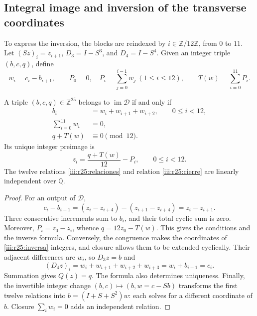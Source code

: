 \subsection{Integral image and inversion of the transverse coordinates}
\label{iii:r25:imagen-seccion}

To express the inversion, the blocks are reindexed by
$i\in\mathbb Z/12\mathbb Z$, from $0$ to $11$. Let
$(Sz)_i=z_{i+1}$, $D_3=I-S^3$, and $D_4=I-S^4$.
Given an integer triple $(b,c,q)$, define
\begin{equation}
 w_i=c_i-b_{i+1},\qquad
 P_0=0,\quad P_i=\sum_{j=0}^{i-1}w_j\ (1\leq i\leq12),
 \qquad T(w)=\sum_{i=0}^{11}P_i.
 \label{iii:r25:incrementos}
\end{equation}

\begin{theorem}
\label{iii:r25:imagen}
A triple $(b,c,q)\in\mathbb Z^{25}$ belongs to
$\operatorname{im}\mathcal D$ if and only if
\begin{align}
 b_i&=w_i+w_{i+1}+w_{i+2},\qquad 0\leq i<12,
       \label{iii:r25:relaciones}\\
 \sum_{i=0}^{11}w_i&=0,\label{iii:r25:cierre}\\
 q+T(w)&\equiv0\pmod {12}.\label{iii:r25:congruencia}
\end{align}
Its unique integer preimage is
\begin{equation}
 z_i=\frac{q+T(w)}{12}-P_i,\qquad0\leq i<12.
 \label{iii:r25:inversa}
\end{equation}
The twelve relations \eqref{iii:r25:relaciones} and relation
\eqref{iii:r25:cierre} are linearly independent over
$\mathbb Q$.
\end{theorem}
\begin{proof}
For an output of $\mathcal D$,
\[
 c_i-b_{i+1}
 =(z_i-z_{i+4})-(z_{i+1}-z_{i+4})=z_i-z_{i+1}.
\]
Three consecutive increments sum to $b_i$, and their total
cyclic sum is zero. Moreover, $P_i=z_0-z_i$, whence
$q=12z_0-T(w)$. This gives the conditions and the inverse formula.
Conversely, the congruence makes the coordinates of
\eqref{iii:r25:inversa} integers, and closure allows them to be
extended cyclically. Their adjacent differences are $w_i$, so $D_3z=b$
and
\[
 (D_4z)_i=w_i+w_{i+1}+w_{i+2}+w_{i+3}
 =w_i+b_{i+1}=c_i.
\]
Summation gives $Q(z)=q$. The formula also determines uniqueness.
Finally, the invertible integer change
$(b,c)\mapsto(b,w=c-Sb)$ transforms the first twelve relations
into $b=(I+S+S^2)w$: each solves for a different coordinate of
$b$. Closure $\sum_iw_i=0$ adds an independent relation.
\end{proof}


